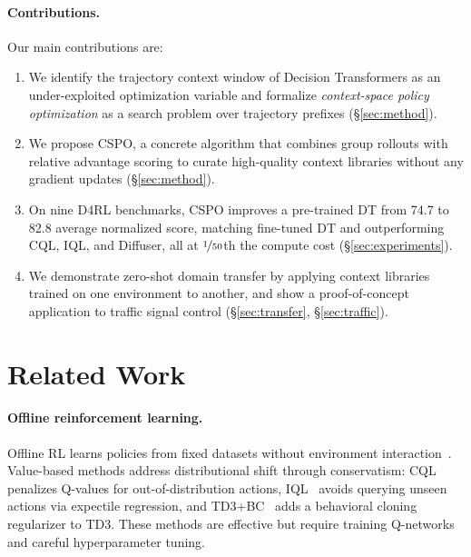 \documentclass{article}
\newcommand{\cspo}{\textsc{CSPO}}
\begin{document}
\paragraph{Contributions.} Our main contributions are:
\begin{enumerate}
    \item We identify the trajectory context window of Decision Transformers as an under-exploited optimization variable and formalize \emph{context-space policy optimization} as a search problem over trajectory prefixes (\S\ref{sec:method}).
    \item We propose \cspo{}, a concrete algorithm that combines group rollouts with relative advantage scoring to curate high-quality context libraries without any gradient updates (\S\ref{sec:method}).
    \item On nine D4RL benchmarks, \cspo{} improves a pre-trained DT from 74.7 to 82.8 average normalized score, matching fine-tuned DT and outperforming CQL, IQL, and Diffuser, all at $\nicefrac{1}{50}$th the compute cost (\S\ref{sec:experiments}).
    \item We demonstrate zero-shot domain transfer by applying context libraries trained on one environment to another, and show a proof-of-concept application to traffic signal control (\S\ref{sec:transfer}, \S\ref{sec:traffic}).
\end{enumerate}


\section{Related Work}
\label{sec:related}

\paragraph{Offline reinforcement learning.}
Offline RL learns policies from fixed datasets without environment interaction~\citep{levine2020offline}. Value-based methods address distributional shift through conservatism: CQL~\citep{kumar2020conservative} penalizes Q-values for out-of-distribution actions, IQL~\citep{kostrikov2022offline} avoids querying unseen actions via expectile regression, and TD3+BC~\citep{fujimoto2021minimalist} adds a behavioral cloning regularizer to TD3. These methods are effective but require training Q-networks and careful hyperparameter tuning.
\end{document}
